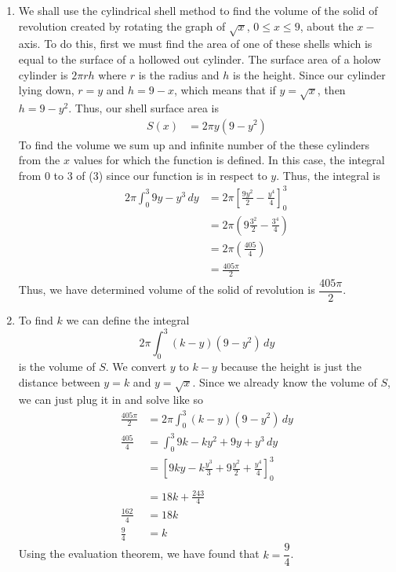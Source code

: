 \documentclass{article}
\begin{document}
\begin{enumerate}[label=\textbf{(8.\arabic*)}]
\begin{enumerate}
\item We shall use the cylindrical shell method to find the volume of the solid of revolution created by rotating the graph of $\sqrt{x}$, $0\le x\le9$, about the $x-$axis. To do this, first we must find the area of one of these shells which is equal to the surface of a hollowed out cylinder. The surface area of a holow cylinder is $2\pi rh$ where $r$ is the radius and $h$ is the height. Since our cylinder lying down, $r=y$ and $h=9-x$, which means that if $y=\sqrt{x}$, then $h=9-y^2$. Thus, our shell surface area is 
\begin{align}
S(x) &= 2\pi y(9-y^2)
\end{align}
To find the volume we sum up and infinite number of the these cylinders from the $x$ values for which the function is defined. In this case, the integral from 0 to 3 of (3) since our function is in respect to $y$. Thus, the integral is
\begin{align*}
2\pi\int_0^3\!9y-y^3\,dy &= 2\pi\left[\frac{9y^2}{2}-\frac{y^4}{4}\right]_0^3\\
&= 2\pi\left(9\frac{3^2}{2}-\frac{3^4}{4}\right)\\
&= 2\pi(\frac{405}{4})\\
&= \frac{405\pi}{2}
\end{align*}
Thus, we have determined volume of the solid of revolution is $\dfrac{405\pi}{2}$.
\item To find $k$ we can define the integral
\[2\pi\int_0^3\!(k-y)(9-y^2)\,dy\]
is the volume of $S$. We convert $y$ to $k-y$ because the height is just the distance between $y=k$ and $y=\sqrt{x}$. Since we already know the volume of $S$, we can just plug it in and solve like so
\begin{align*}
\frac{405\pi}{2} &= 2\pi\int_0^3\!(k-y)(9-y^2)\,dy\\
\frac{405}{4} &= \int_0^3\!9k-ky^2+9y+y^3\,dy\\
&= \left[9ky-k\frac{y^3}{3}+9\frac{y^2}{2}+\frac{y^4}{4}\right]_0^3\\\\
&= 18k+\frac{243}{4}\\
\frac{162}{4} &= 18k\\
\frac{9}{4} &= k
\end{align*}
Using the evaluation theorem, we have found that $k=\dfrac{9}{4}$.
\end{enumerate}


\end{enumerate}
\end{document}
